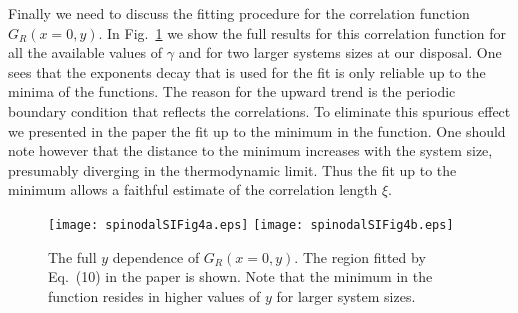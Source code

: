 \documentclass[aps,pnas,float]{revtex4}
\begin{document}
Finally we need to discuss the fitting procedure for the correlation function $G_R(x=0,y)$. In Fig.~\ref{full}
we show the full results for this correlation function for all the available values of $\gamma$ and for two larger systems sizes at our disposal. One sees that the exponents decay that is used for the fit is only
reliable up to the minima of the functions. The reason for the upward trend is the periodic boundary condition that reflects the correlations. To eliminate this spurious effect we presented in the paper the fit
up to the minimum in the function. One should note however that the distance to the minimum increases
with the system size, presumably diverging in the thermodynamic limit. Thus the fit up to the minimum
allows a faithful estimate of the correlation length $\xi$.
\begin{figure}[htb]
 \texttt{[image: spinodalSIFig4a.eps]}
 \texttt{[image: spinodalSIFig4b.eps]}
\caption{The full $y$ dependence of $G_R(x=0,y)$. The region fitted by Eq.~(10) in the paper
is shown. Note that the minimum in the function resides in higher values of $y$ for larger
system sizes.}
\label{full}
\end{figure}


%
\end{document}
